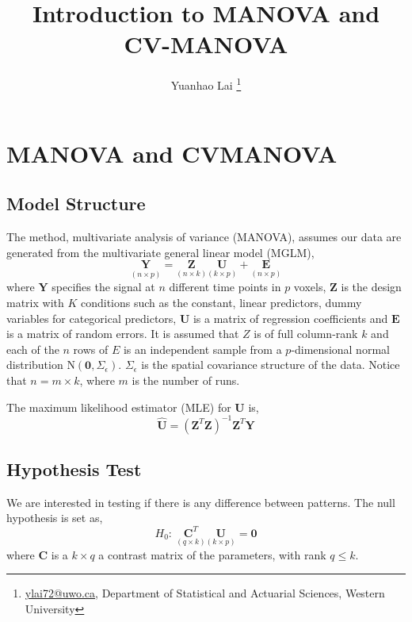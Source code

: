 \documentclass[english]{article}\usepackage[]{graphicx}\usepackage[]{color}
\begin{document}
\title{Introduction to MANOVA and CV-MANOVA}


\author{Yuanhao Lai%
\thanks{\protect\url{ylai72@uwo.ca}, Department of Statistical and Actuarial
Sciences, Western University%
}}

\maketitle
\vspace{-30bp}



\section{MANOVA and CVMANOVA}


\subsection{Model Structure}

The method, multivariate analysis of variance (MANOVA)\cite{fox2013hypothesis},
assumes our data are generated from the multivariate general linear
model (MGLM), 
\[
\underset{\left(n\times p\right)}{\boldsymbol{Y}}=\underset{\left(n\times k\right)}{\boldsymbol{Z}}\underset{\left(k\times p\right)}{\boldsymbol{U}}+\underset{\left(n\times p\right)}{\boldsymbol{E}}
\]
where $\boldsymbol{Y}$ specifies the signal at $n$ different time
points in $p$ voxels, $\boldsymbol{Z}$ is the design matrix with
$K$ conditions such as the constant, linear predictors, dummy variables
for categorical predictors, $\boldsymbol{U}$ is a matrix of regression
coefficients and $\boldsymbol{E}$ is a matrix of random errors. It
is assumed that $Z$ is of full column-rank $k$ and each of the $n$
rows of $E$ is an independent sample from a $p$-dimensional normal
distribution $\text{N}(\boldsymbol{0},\Sigma_{\epsilon})$. $\Sigma_{\epsilon}$
is the spatial covariance structure of the data. Notice that $n=m\times k$,
where $m$ is the number of runs.

The maximum likelihood estimator (MLE) for $\boldsymbol{U}$ is, 
\[
\hat{\boldsymbol{U}}=\left(\boldsymbol{Z}^{T}\boldsymbol{Z}\right)^{-1}\boldsymbol{Z}^{T}\boldsymbol{Y}
\]



\subsection{Hypothesis Test}

We are interested in testing if there is any difference between patterns.
The null hypothesis is set as, 
\[
H_{0}:\ \underset{\left(q\times k\right)}{\boldsymbol{C}^{T}}\underset{\left(k\times p\right)}{\boldsymbol{U}}=\boldsymbol{0}
\]
where $\boldsymbol{C}$ is a $k\times q$ a contrast matrix of the
parameters, with rank $q\le k$.
\end{document}

